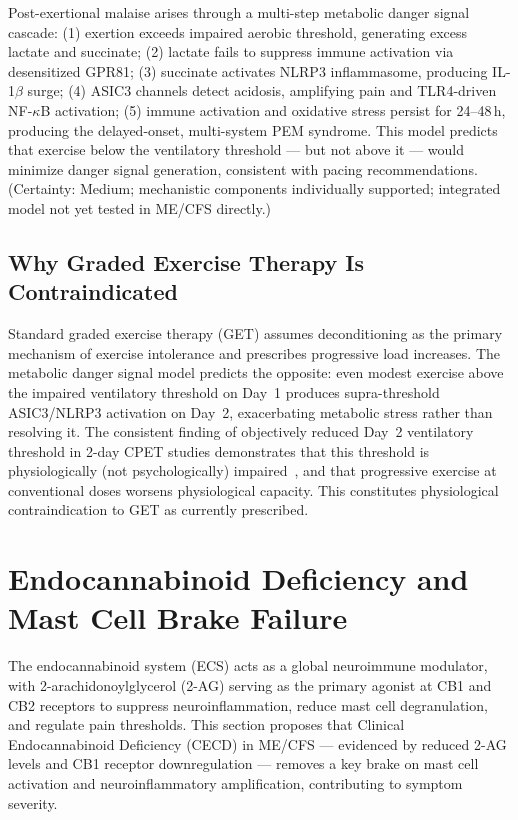 \begin{hypothesis}
\label{hyp:ch15-pem-cascade}
Post-exertional malaise arises through a multi-step metabolic danger signal cascade: (1) exertion exceeds impaired aerobic threshold, generating excess lactate and succinate; (2) lactate fails to suppress immune activation via desensitized GPR81; (3) succinate activates NLRP3 inflammasome, producing IL-1$\beta$ surge; (4) ASIC3 channels detect acidosis, amplifying pain and TLR4-driven NF-$\kappa$B activation; (5) immune activation and oxidative stress persist for 24--48\,h, producing the delayed-onset, multi-system PEM syndrome. This model predicts that exercise below the ventilatory threshold --- but not above it --- would minimize danger signal generation, consistent with pacing recommendations. (Certainty: Medium; mechanistic components individually supported; integrated model not yet tested in ME/CFS directly.)
\end{hypothesis}

\subsection{Why Graded Exercise Therapy Is Contraindicated}

Standard graded exercise therapy (GET) assumes deconditioning as the primary mechanism of exercise intolerance and prescribes progressive load increases. The metabolic danger signal model predicts the opposite: even modest exercise above the impaired ventilatory threshold on Day~1 produces supra-threshold ASIC3/NLRP3 activation on Day~2, exacerbating metabolic stress rather than resolving it. The consistent finding of objectively reduced Day~2 ventilatory threshold in 2-day CPET studies demonstrates that this threshold is physiologically (not psychologically) impaired~\cite{keller2024cpet,VanCampen2020SeverityCPET}, and that progressive exercise at conventional doses worsens physiological capacity. This constitutes physiological contraindication to GET as currently prescribed.


\section{Endocannabinoid Deficiency and Mast Cell Brake Failure}
\label{sec:ch15-endocannabinoid}

The endocannabinoid system (ECS) acts as a global neuroimmune modulator, with 2-arachidonoylglycerol (2-AG) serving as the primary agonist at CB1 and CB2 receptors to suppress neuroinflammation, reduce mast cell degranulation, and regulate pain thresholds. This section proposes that Clinical Endocannabinoid Deficiency (CECD) in ME/CFS --- evidenced by reduced 2-AG levels and CB1 receptor downregulation --- removes a key brake on mast cell activation and neuroinflammatory amplification, contributing to symptom severity.

